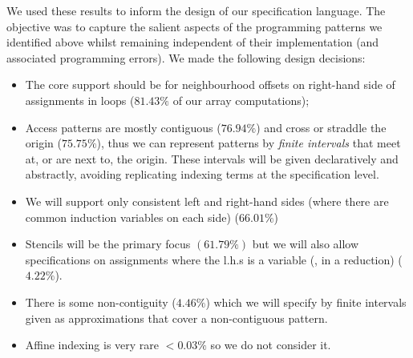 \noindent
We used these results to inform the design of our specification
language. The objective was to capture the salient aspects of the
programming patterns we identified above whilst remaining independent
of their implementation (and associated programming errors). We made the following design decisions:
%
\begin{itemize}[leftmargin=1.5em]
\item The core support should be for neighbourhood offsets on
right-hand side of assignments in loops ($81.43\%$
of our array computations);

\item Access patterns are mostly contiguous ($76.94\%$) and cross or
straddle the origin ($75.75\%$), thus we can represent patterns by
\emph{finite intervals} that meet at, or are next to, the origin.
These intervals will be given declaratively and abstractly, avoiding
replicating indexing terms at the specification level.

\item We will support only consistent left and right-hand sides
(where there are common induction variables on each side) ($66.01\%$)

\item Stencils will be the primary focus $(61.79\%)$ but we will also
allow specifications on assignments where the l.h.s is a variable
(\eg{}, in a reduction) ($4.22\%$).

\item There is some non-contiguity ($4.46\%$) which we will specify
by finite intervals given as approximations that cover a non-contiguous pattern.

\item Affine indexing is very rare $<0.03\%$ so we do not consider it.
\end{itemize}
%


